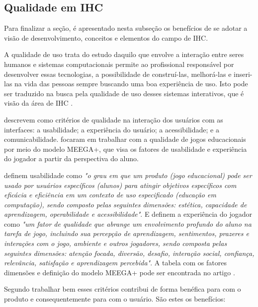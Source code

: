 \subsection{Qualidade em IHC}
\label{sub:quali}
Para finalizar a seção, é apresentado nesta subseção os benefícios de se adotar a visão de desenvolvimento, conceitos e elementos do campo de IHC.

A qualidade de uso trata do estudo daquilo que envolve a interação entre seres humanos e sistemas computacionais permite ao profissional responsável por desenvolver essas tecnologias, a possibilidade de construí-las, melhorá-las e inseri-las na vida das pessoas sempre buscando uma boa experiência de uso. Isto pode ser traduzido na busca pela qualidade de uso desses sistemas interativos, que é visão da área de IHC \cite[p. 13, 14]{barbosa_silva}.%

 descrevem como critérios de qualidade na interação dos usuários com as interfaces: a usabilidade; a experiência do usuário; a acessibilidade; e a comunicabilidade.  focaram em trabalhar com a qualidade de jogos educacionais por meio do modelo MEEGA+, que visa os fatores de usabilidade e experiência do jogador a partir da perspectiva do aluno. 

{\color{textmodified}
 definem usabilidade como \textit{"o grau em que um produto (jogo educacional) pode ser usado por usuários específicos (alunos) para atingir objetivos específicos com eficácia e eficiência em um contexto de uso especificado (educação em computação), sendo composto pelas seguintes dimensões: estética, capacidade de aprendizagem, operabilidade e acessibilidade"}. E definem a experiência do jogador como \textit{"um fator de qualidade que abrange um envolvimento profundo do aluno na tarefa de jogo, incluindo sua percepção de aprendizagem, sentimentos, prazeres e interações com o jogo, ambiente e outros jogadores, sendo composta pelas seguintes dimensões: atenção focada, diversão, desafio, interação social, confiança, relevância, satisfação e aprendizagem percebida"}. A tabela com os fatores dimensões e definição do modelo MEEGA+ pode ser encontrada no artigo . %
}

Segundo  trabalhar bem esses critérios contribui de forma benéfica para com o produto e consequentemente para com o usuário. São estes os benefícios: %

